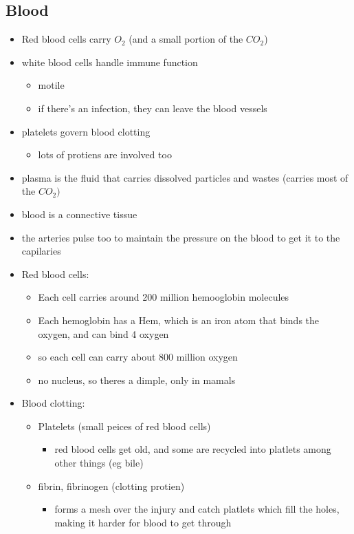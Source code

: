 \documentclass{article}
\theoremstyle{definition}
\begin{document}
\subsection{Blood}
\begin{itemize}
	\item Red blood cells carry $O_2$ (and a small portion of the $CO_2$)
	\item white blood cells  handle immune function
		\begin{itemize}
			\item motile
			\item if there's an infection, they can leave the blood vessels
		\end{itemize}
	\item platelets govern blood clotting
		\begin{itemize}
			\item lots of protiens are involved too
		\end{itemize}
	\item plasma is the fluid that carries dissolved particles and wastes (carries most of the $CO_2)$
	\item blood is a  connective tissue
	\item the arteries pulse too to maintain the pressure on the blood to get it to the capilaries
	\item Red blood cells:
		\begin{itemize}
			\item Each cell carries around 200 million hemooglobin molecules
			\item Each hemoglobin has a Hem, which is an iron atom that binds the oxygen, and can bind 4 oxygen
			\item so each cell can carry about 800 million oxygen
			\item no nucleus, so theres a dimple, only in mamals
		\end{itemize}
	\item Blood clotting:
		\begin{itemize}
			\item Platelets (small peices of red blood cells)
				\begin{itemize}
					\item red blood cells get old, and some are recycled into platlets among other things (eg bile)
				\end{itemize}
			\item fibrin, fibrinogen (clotting protien)
				\begin{itemize}
					\item forms a mesh over the injury and catch platlets which fill the holes, making it harder for blood to get through

\end{itemize}
\end{itemize}
\end{itemize}
\end{document}
